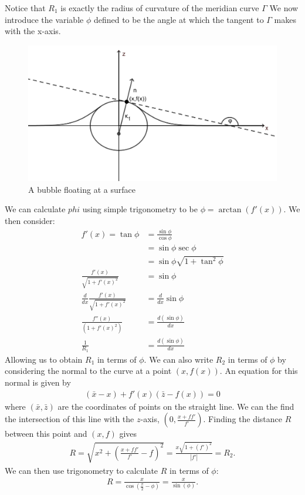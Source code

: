 Notice that $R_1$ is exactly the radius of curvature of the meridian curve $\Gamma$
We now introduce the variable $\phi$ defined to be the angle at which the tangent to $\Gamma$ makes with the x-axis. 
\begin{figure}[hb]
    \centering
    \includegraphics[width=0.55\linewidth]{WriteUp/images/tangent to bubble extra.png}
    \caption{A bubble floating at a surface}
    \label{fig:1}
\end{figure}
We can calculate $phi$ using simple trigonometry to be $\phi=\arctan(f'(x))$. We then consider:
\begin{align}
    f'(x)=\tan \phi &= \frac{\sin\phi}{\cos\phi} \\
    &=\sin\phi\sec\phi \\
    &=\sin\phi \sqrt{1+\tan^2\phi}\\
    \frac{f'(x)}{\sqrt{1+f'(x)^2}}&=\sin\phi\\
    \frac{d}{dx} \frac{f'(x)}{\sqrt{1+f'(x)^2}}&=\frac{d}{dx}\sin\phi \\
    \frac{f''(x)}{(1+f'(x)^2)}&=\frac{d(\sin\phi)}{dx} \\
    \frac{1}{R_1}&=\frac{d(\sin\phi)}{dx}
\end{align}
Allowing us to obtain $R_1$ in terms of $\phi$.
We can also write $R_2$ in terms of $\phi$ by considering the normal to the curve at a point $(x,f(x))$. An equation for this normal is given by
\begin{align}
    (\bar{x}-x) + f'(x)(\bar{z}-f(x))=0
\end{align}
where $(\bar{x},\bar{z})$ are the coordinates of points on the straight line. We can the find the intersection of this line with the $z$-axis, $(0,\frac{x+ff'}{f'})$.
Finding the distance $R$ between this point and $(x,f)$ gives
\begin{align}
    R=\sqrt{x^2+(\frac{x+ff'}{f'}-f)^2}=\frac{x\sqrt{1+(f')^2}}{|f'|}=R_2.
\end{align}
We can then use trigonometry to calculate $R$ in terms of $\phi$:
\begin{align}
    R=\frac{x}{\cos(\frac{\pi}{2}-\phi)}=\frac{x}{\sin(\phi)}.
\end{align}
